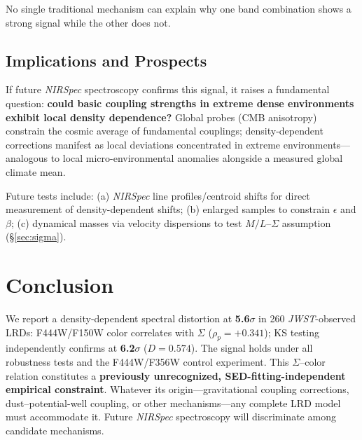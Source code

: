 \documentclass[apjl,twocolumn,longbibliography,linenumbers]{aastex701}
\begin{document}
No single traditional mechanism can explain why one band combination
shows a strong signal while the other does not.

\subsection{Implications and Prospects}

If future \textit{NIRSpec} spectroscopy confirms this signal, it raises a fundamental
question: \textbf{could basic coupling strengths in extreme dense environments
exhibit local density dependence?}
Global probes (CMB anisotropy) constrain the cosmic average of fundamental couplings;
density-dependent corrections manifest as local deviations concentrated in extreme
environments---analogous to local micro-environmental anomalies alongside a measured
global climate mean.

Future tests include:
(a) \textit{NIRSpec} line profiles/centroid shifts for direct measurement of
density-dependent shifts;
(b) enlarged samples to constrain $\epsilon$ and $\beta$;
(c) dynamical masses via velocity dispersions to test $M/L$--$\Sigma$
assumption (\S\ref{sec:sigma}).



\section{Conclusion}

We report a density-dependent spectral distortion at \textbf{5.6$\sigma$} in 260
\textit{JWST}-observed LRDs: F444W/F150W color correlates with $\Sigma$
($\rho_p = +0.341$); KS testing independently confirms at \textbf{6.2$\sigma$}
($D = 0.574$).
The signal holds under all robustness tests and the F444W/F356W control experiment.
This $\Sigma$--color relation constitutes a
\textbf{previously unrecognized, SED-fitting-independent empirical constraint}.
Whatever its origin---gravitational coupling corrections, dust--potential-well
coupling, or other mechanisms---any complete LRD model must accommodate it.
Future \textit{NIRSpec} spectroscopy will discriminate among candidate mechanisms.


\end{document}
